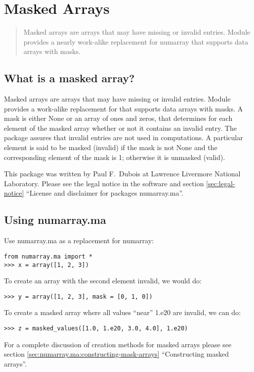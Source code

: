 \chapter{Masked Arrays}
\label{cha:masked-arrays}

\makeatletter
\py@reset
\makeatother

\begin{quote}
   Masked arrays are arrays that may have missing or invalid entries. Module
    provides a nearly work-alike replacement for numarray
   that supports data arrays with masks.
\end{quote}

\section{What is a masked array?}
\label{sec:numarray.ma:what-is-a-masked-array}

Masked arrays are arrays that may have missing or invalid entries. Module
 provides a work-alike replacement for \module{\numarray}
that supports data arrays with masks. A mask is either None or an array of ones
and zeros, that determines for each element of the masked array whether or not
it contains an invalid entry.  The package assures that invalid entries are not
used in computations.  A particular element is said to be masked
(invalid) if the mask is not None and the
corresponding element of the mask is 1; otherwise it is unmasked
(valid).

This package was written by Paul F.\ Dubois at Lawrence
Livermore National Laboratory. Please see the legal notice in the software and
section \ref{sec:legal-notice} ``License and disclaimer for packages
numarray.ma''. 

\section{Using numarray.ma}
\label{sec:numarray.ma:using}

Use numarray.ma as a replacement for numarray:
\begin{verbatim}
from numarray.ma import *
>>> x = array([1, 2, 3])
\end{verbatim}
To create an array with the second element invalid, we would do:
\begin{verbatim}
>>> y = array([1, 2, 3], mask = [0, 1, 0])
\end{verbatim}
To create a masked array where all values ``near'' 1.e20 are invalid, we can
do:
\begin{verbatim}
>>> z = masked_values([1.0, 1.e20, 3.0, 4.0], 1.e20)
\end{verbatim}
For a complete discussion of creation methods for masked arrays please see
section \ref{sec:numarray.ma:constructing-mask-arrays} ``Constructing masked
arrays''.


